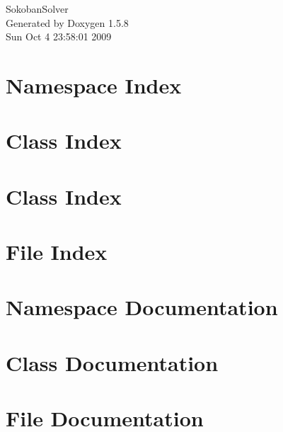 \documentclass[a4paper]{book}
\begin{document}
\begin{titlepage}
\vspace*{7cm}
\begin{center}
{\Large SokobanSolver }\\
\vspace*{1cm}
{\large Generated by Doxygen 1.5.8}\\
\vspace*{0.5cm}
{\small Sun Oct 4 23:58:01 2009}\\
\end{center}
\end{titlepage}
\clearemptydoublepage
{}
\tableofcontents
\clearemptydoublepage
{}
\chapter{Namespace Index}

\chapter{Class Index}

\chapter{Class Index}

\chapter{File Index}

\chapter{Namespace Documentation}

\chapter{Class Documentation}








\chapter{File Documentation}







\printindex
\end{document}
